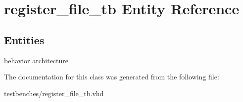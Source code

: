 \hypertarget{classregister__file__tb}{\section{register\-\_\-file\-\_\-tb \-Entity \-Reference}
\label{classregister__file__tb}
}
\subsection*{\-Entities}
\begin{DoxyCompactItemize}
\item 
\hyperlink{classregister__file__tb_1_1behavior}{behavior} architecture
\end{DoxyCompactItemize}


\-The documentation for this class was generated from the following file\-:\begin{DoxyCompactItemize}
\item 
testbenches/register\-\_\-file\-\_\-tb.\-vhd\end{DoxyCompactItemize}

